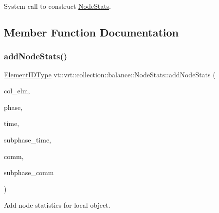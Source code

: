 System call to construct {\ttfamily \hyperlink{structvt_1_1vrt_1_1collection_1_1balance_1_1_node_stats}{Node\+Stats}}. 



\subsection{Member Function Documentation}
\mbox{\label{structvt_1_1vrt_1_1collection_1_1balance_1_1_node_stats_a8bf0798c086f7e9c28b81463672f31d8}} 
\subsubsection{\texorpdfstring{add\+Node\+Stats()}{addNodeStats()}}
{\footnotesize\ttfamily \hyperlink{namespacevt_1_1vrt_1_1collection_1_1balance_a14c8d2c972f2913aa3f1636e5be0a120}{Element\+I\+D\+Type} vt\+::vrt\+::collection\+::balance\+::\+Node\+Stats\+::add\+Node\+Stats (\begin{DoxyParamCaption}\item[{\hyperlink{structvt_1_1vrt_1_1collection_1_1_migratable}{Migratable} $\ast$}]{col\+\_\+elm,  }\item[{\hyperlink{namespacevt_a46ce6733d5cdbd735d561b7b4029f6d7}{Phase\+Type} const \&}]{phase,  }\item[{\hyperlink{namespacevt_a876a9d0cd5a952859c72de8a46881442}{Time\+Type} const \&}]{time,  }\item[{std\+::vector$<$ \hyperlink{namespacevt_a876a9d0cd5a952859c72de8a46881442}{Time\+Type} $>$ const \&}]{subphase\+\_\+time,  }\item[{\hyperlink{namespacevt_1_1vrt_1_1collection_1_1balance_a10860c956804d644db54a16012352728}{Comm\+Map\+Type} const \&}]{comm,  }\item[{std\+::vector$<$ \hyperlink{namespacevt_1_1vrt_1_1collection_1_1balance_a10860c956804d644db54a16012352728}{Comm\+Map\+Type} $>$ const \&}]{subphase\+\_\+comm }\end{DoxyParamCaption})}



Add node statistics for local object. 


